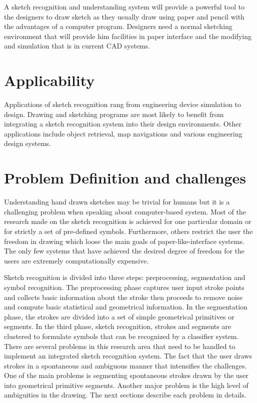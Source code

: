 A sketch recognition and understanding system will provide a powerful tool to the designers to draw sketch as they usually draw using paper and pencil with the advantages of a computer program. Designers need a normal sketching environment that will provide him facilities in paper interface and the modifying and simulation that is in current CAD systems. 
 
\section{Applicability }
Applications of sketch recognition rang from engineering device simulation to design. Drawing and sketching programs are most likely to benefit from integrating a sketch recognition system into their design environments. Other applications include object retrieval, map navigations and various engineering design systems.

\section{Problem Definition and challenges}
\label{sec:ProblemsAndChallenges}

Understanding hand drawn sketches may be trivial for humans but it is a challenging problem when speaking about computer-based system. Most of the research made on the sketch recognition is achieved for one particular domain or for strictly a set of pre-defined symbols\cite{Vibratory8,physicalmeaning6}. Furthermore, others restrict the user the freedom in drawing which loose the main goals of paper-like-interface systems\cite{gestureexample12,aideddesgin22,sketchinginterfaces2}. The only few systems that have achieved the desired degree of freedom for the users are extremely computationally expensive\cite{EfficientAbstract39,SketchRead2007}.

Sketch recognition is divided into three steps: preprocessing, segmentation and symbol recognition. The preprocessing phase captures user input stroke points and collects basic information about the stroke then proceeds to remove noise and compute basic statistical and geometrical information. In the segmentation phase, the strokes are divided into a set of simple geometrical primitives or segments. In the third phase, sketch recognition, strokes and segments are clustered to formulate symbols that can be recognized by a classifier system.
There are several problems in this research area that need to be handled to implement an integrated sketch recognition system. The fact that the user draws strokes in a spontaneous and ambiguous manner that intensifies the challenges. One of the main problems is segmenting spontaneous strokes drawn by the user into geometrical primitive segments. Another major problem is the high level of ambiguities in the drawing. The next sections describe each problem in details. 


